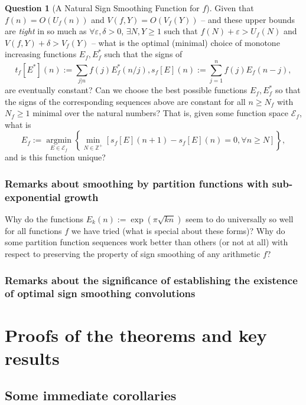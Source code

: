 \documentclass[11pt,reqno]{amsart}
\numberwithin{figure}{section}
\numberwithin{table}{section}
\theoremstyle{plain}
\numberwithin{theorem}{section}
\theoremstyle{definition}
\newtheorem{question}[theorem]{Question}
\begin{document}
\begin{question}[A Natural Sign Smoothing Function for $f$]
Given that $f(n) = O(U_f(n))$ and $V(f, Y) = O(V_f(Y))$ -- and these upper bounds are \emph{tight} in so much as 
$\forall \varepsilon, \delta>0$, $\exists N, Y \geq 1$ such that $f(N) + \varepsilon > U_f(N)$ and 
$V(f, Y) + \delta > V_f(Y)$ -- 
what is the optimal (minimal) choice of 
monotone increasing functions $E_f, E_f^{\ast}$ such that the signs of 
\[
t_f[E^{\ast}](n) := \sum_{j|n} f(j) E_f^{\ast}(n/j), s_f[E](n) := \sum_{j=1}^{n} f(j) E_f(n-j), 
\]
are eventually constant? Can we choose the best possible functions $E_f, E_f^{\ast}$ so that the signs of the 
corresponding sequences above are constant for all $n \geq N_f$ with $N_f \geq 1$ minimal over the natural 
numbers? That is, given some function space $\mathcal{E}_f$, what is 
\[
E_f := \operatorname{argmin}\limits_{E \in \mathcal{E}_f} \left\{ 
     \min_{N \in \mathbb{Z}^{+}} \left[s_f[E](n+1) - s_f[E](n) = 0, \forall n \geq N
     \right]\right\}, 
\]
and is this function unique? 
\end{question} 

\subsubsection{Remarks about smoothing by partition functions with sub-exponential growth} 

Why do the functions $E_k(n) := \exp(\pi \sqrt{kn})$ seem to do universally so well for all functions $f$ 
we have tried (what is special about these forms)? Why do some partition function sequences work better than 
others (or not at all) with respect to preserving the property of sign smoothing of any arithmetic $f$? 

\subsubsection{Remarks about the significance of establishing the 
               existence of optimal sign smoothing convolutions} 

\section{Proofs of the theorems and key results} 


\subsection{Some immediate corollaries} 
\end{document}
